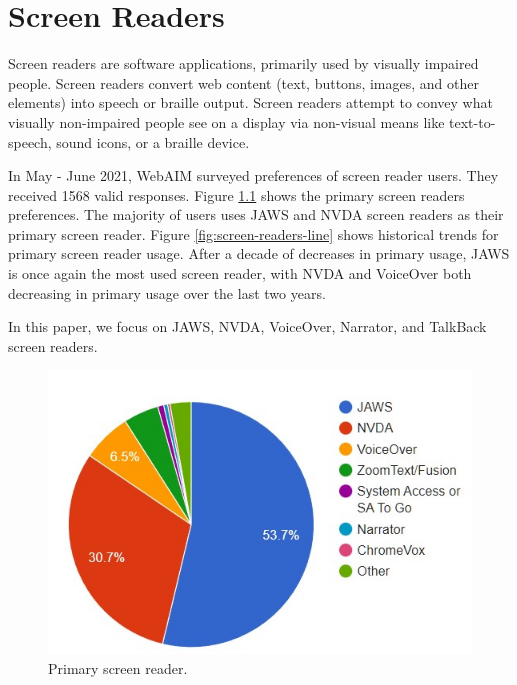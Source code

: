 %
%
% 
% 
% 


\chapter{Screen Readers}

\label{chap:Intro}



Screen readers are software applications, primarily used by visually impaired people. Screen readers convert web content (text, buttons, images, and other elements) into speech or braille output. Screen readers attempt to convey what visually non-impaired people see on a display via non-visual means like text-to-speech, sound icons, or a braille device.

In May - June 2021, WebAIM surveyed preferences of screen reader users. They received 1568 valid responses. Figure \ref{fig:screen-readers-piechart} shows the primary screen readers preferences. The majority of users uses JAWS and NVDA screen readers as their primary screen reader. Figure \ref{fig:screen-readers-line} shows historical trends for primary screen reader usage. After a decade of decreases in primary usage, JAWS is once again the most used screen reader, with NVDA and VoiceOver both decreasing in primary usage over the last two years.

In this paper, we focus on JAWS, NVDA, VoiceOver, Narrator, and TalkBack screen readers.

\begin{figure}[tp]
\centering
\includegraphics[keepaspectratio,width=\linewidth,height=\halfh]
{images/screen-readers-piechart.jpg}

\caption[Primary screen reader]{
Primary screen reader.
}
\label{fig:screen-readers-piechart}
\end{figure}

